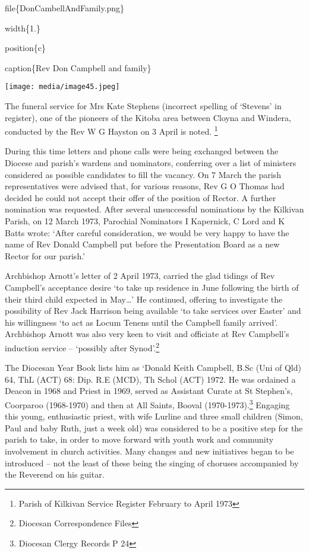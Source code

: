 file\{DonCambellAndFamily.png\}

width\{1.\}

position\{c\}

caption\{Rev Don Campbell and family\}

\texttt{[image: media/image45.jpeg]}

The funeral service for Mrs Kate Stephens (incorrect spelling of `Stevens' in register), one of the pioneers of the Kitoba area between Cloyna and Windera, conducted by the Rev W G Hayston on 3 April is noted. \footnote{Parish of Kilkivan Service Register February to April 1973}

During this time letters and phone calls were being exchanged between the Diocese and parish's wardens and nominators, conferring over a list of ministers considered as possible candidates to fill the vacancy. On 7 March the parish representatives were advised that, for various reasons, Rev G O Thomas had decided he could not accept their offer of the position of Rector. A further nomination was requested. After several unsuccessful nominations by the Kilkivan Parish, on 12 March 1973, Parochial Nominators I Kapernick, C Lord and K Batts wrote: `After careful consideration, we would be very happy to have the name of Rev Donald Campbell put before the Presentation Board as a new Rector for our parish.'

Archbishop Arnott's letter of 2 April 1973, carried the glad tidings of Rev Campbell's acceptance desire `to take up residence in June following the birth of their third child expected in May\ldots' He continued, offering to investigate the possibility of Rev Jack Harrison being available `to take services over Easter' and his willingness `to act as Locum Tenens until the Campbell family arrived'. Archbishop Arnott was also very keen to visit and officiate at Rev Campbell's induction service -- `possibly after Synod'.\footnote{Diocesan Correspondence Files}

The Diocesan Year Book lists him as `Donald Keith Campbell, B.Sc (Uni of Qld) 64, ThL (ACT) 68: Dip. R.E (MCD), Th Schol (ACT) 1972. He was ordained a Deacon in 1968 and Priest in 1969, served as Assistant Curate at St Stephen's, Coorparoo (1968-1970) and then at All Saints, Booval (1970-1973).\footnote{Diocesan Clergy Records P 24} Engaging this young, enthusiastic priest, with wife Lurline and three small children (Simon, Paul and baby Ruth, just a week old) was considered to be a positive step for the parish to take, in order to move forward with youth work and community involvement in church activities. Many changes and new initiatives began to be introduced -- not the least of these being the singing of choruses accompanied by the Reverend on his guitar.

